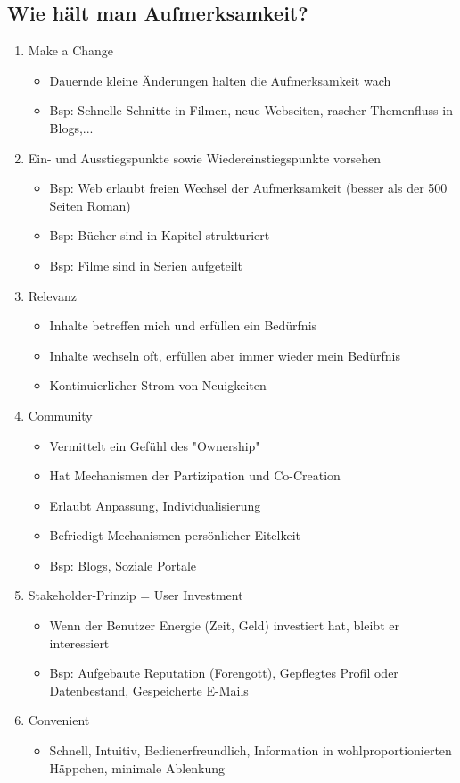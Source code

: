 \documentclass{article} %
\begin{document}
	\subsection{Wie hält man Aufmerksamkeit?}
	\begin{enumerate}
		\item Make a Change
		\begin{itemize}
			\item Dauernde kleine Änderungen halten die Aufmerksamkeit wach
			\item Bsp: Schnelle Schnitte in Filmen, neue Webseiten, rascher Themenfluss in Blogs,...
		\end{itemize}
		\item Ein- und Ausstiegspunkte sowie Wiedereinstiegspunkte vorsehen
		\begin{itemize}
			\item Bsp: Web erlaubt freien Wechsel der Aufmerksamkeit (besser als der 500 Seiten
Roman)
			\item Bsp: Bücher sind in Kapitel strukturiert
			\item Bsp: Filme sind in Serien aufgeteilt
		\end{itemize}
		\item Relevanz
		\begin{itemize}
			\item Inhalte betreffen mich und erfüllen ein Bedürfnis
			\item Inhalte wechseln oft, erfüllen aber immer wieder mein Bedürfnis
			\item Kontinuierlicher Strom von Neuigkeiten
		\end{itemize}
		\item Community
		\begin{itemize}
			\item Vermittelt ein Gefühl des "Ownership"
			\item Hat Mechanismen der Partizipation und Co-Creation
			\item Erlaubt Anpassung, Individualisierung
			\item Befriedigt Mechanismen persönlicher Eitelkeit
			\item Bsp: Blogs, Soziale Portale
		\end{itemize}
		\item Stakeholder-Prinzip = User Investment
		\begin{itemize}
			\item Wenn der Benutzer Energie (Zeit, Geld) investiert hat, bleibt er interessiert
			\item Bsp: Aufgebaute Reputation (Forengott), Gepflegtes Profil oder Datenbestand, Gespeicherte E-Mails
		\end{itemize}
		\item Convenient
		\begin{itemize}
			\item Schnell, Intuitiv, Bedienerfreundlich, Information in wohlproportionierten Häppchen, minimale Ablenkung
		\end{itemize}
	\end{enumerate}
\end{document}
